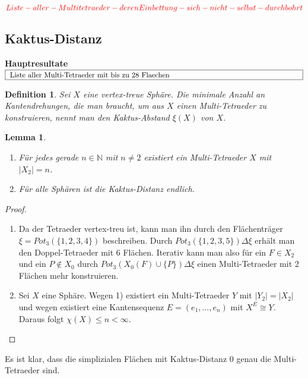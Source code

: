 \documentclass[12pt,titlepage,twoside,cleardoublepage]{article}
\theoremstyle{nummermitklammern}
\newtheorem{lemma}[temp]{Lemma}
\newtheorem{definition}[temp]{Definition}
\newtheorem{definition}[zahl]{Definition}
\newtheorem{lemma}[zahl]{Lemma}
\numberwithin{equation}{section}
\begin{document}
$\textcolor{red}{Liste-aller-Multitetraeder-deren Einbettung-sich-nicht-selbst-durchbohrt}$
\subsection{Kaktus-Distanz}
\textbf{Hauptresultate}\\
$\fbox{
\parbox{14cm}{Liste aller Multi-Tetraeder mit bis zu 28 Flaechen}}$
\begin{definition}
Sei $X$ eine vertex-treue Sphäre. Die minimale Anzahl an Kantendrehungen, die man braucht, um aus $X$ einen Multi-Tetraeder zu  konstruieren, nennt man den \emph{Kaktus-Abstand} $\xi(X)$ von $X$.
\end{definition}
\begin{lemma}
\begin{enumerate}
\item
Für jedes gerade $n \in \mathbb{N}$ mit $n \neq 2$ existiert ein Multi-Tetraeder $X$ mit $\vert X_2\vert=n$.
\item
Für alle Sphären ist die Kaktus-Distanz endlich.
\end{enumerate} 
\end{lemma}
\begin{proof}
\begin{enumerate}
\item Da der Tetraeder vertex-treu ist, kann man ihn durch den Flächenträger $\xi =Pot_3(\{1,2,3,4\})$ beschreiben. Durch $Pot_3(\{1,2,3,5\})\Delta \xi$ erhält man den Doppel-Tetraeder mit 6 Flächen. Iterativ kann man also für ein $F\in X_2$ und ein $P\notin X_0$ durch $Pot_3(X_0(F)\cup \{P\})\Delta \xi$ einen Multi-Tetraeder mit 2 Flächen mehr konstruieren.
\begin{comment}
\item Man führt den Beweis per vollständiger Induktion.
Für $n=4$ hat man den Tetraeder als Multi-Tetraeder. Man nimmt nun an, es gibt Multi-Tetraeder $X$ mit $\vert X_2\vert=n$ und will nun die Existenz eines Multi-Tetraeders $Y$ mit $\vert Y_2\vert =n+2$ nachweisen.Da Multi-Tetraeder vertex-treu sind existiert ein Flächenträger $\zeta \subseteq \{1,\ldots,\vert X_0\vert\}$. Man definiert nun den Flächenträger eines Tetraeders $\xi:=Pot_3(\{\vert X_0\vert +1\}\cup A)$ für ein $A\in \zeta.$ Dann ist $\zeta \Delta \xi$ der Flächenträgers des Multi Tetraeders $\mathcal{S}(\zeta \Delta \xi)$ vom Typ $(a_0+1,\ldots,a_k)$ oder $(1,a_0,\ldots,a_k)$, wobei $(a_0+1,\ldots,a_k)$ der Typ von $X$ ist. Die Flächenanzahl von $Y$ ist
\[
\vert Y_2 \vert=\vert X_2 \vert+4-2=n+2.
\]
\end{comment}
\item
Sei $X$ eine Sphäre. Wegen 1) existiert ein Multi-Tetraeder $Y$ mit $\vert Y_2\vert =\vert X_2\vert $ und wegen  existiert eine Kantensequenz $E=(e_1,\ldots,e_n)$ mit $X^E\cong Y$. Daraus folgt $\chi(X)\leq n<\infty.$ 


\end{enumerate}
\end{proof}
Es ist klar, dass die simplizialen Flächen mit Kaktus-Distanz $0$ genau die Multi-Tetraeder sind. 
\end{document}
